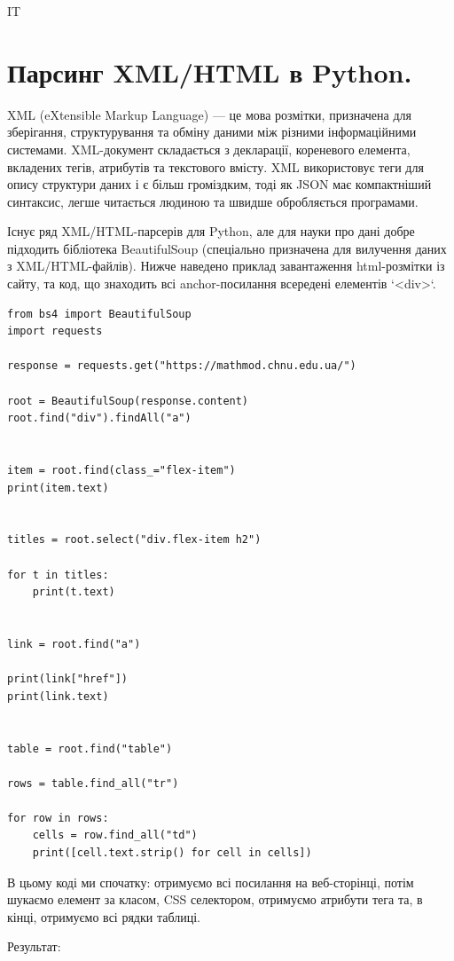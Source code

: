 \begin{console}
IT
\end{console}




\section{Парсинг XML/HTML в Python.}

XML (eXtensible Markup Language) — це мова розмітки, призначена для зберігання, структурування та 
обміну даними між різними інформаційними системами. XML-документ складається з декларації, 
кореневого елемента, вкладених тегів, атрибутів та текстового вмісту. XML використовує теги 
для опису структури даних і є більш громіздким, тоді як JSON має компактніший синтаксис, 
легше читається людиною та швидше обробляється програмами. 

Існує ряд XML/HTML-парсерів для Python, але для науки про дані добре підходить бібліотека 
BeautifulSoup (спеціально призначена для вилучення даних з XML/HTML-файлів). Нижче наведено 
приклад завантаження html-розмітки із сайту, та код, що знаходить всі anchor-посилання 
всередені елементів `<div>`.

\begin{lstlisting}
from bs4 import BeautifulSoup
import requests

response = requests.get("https://mathmod.chnu.edu.ua/")

root = BeautifulSoup(response.content)
root.find("div").findAll("a")


item = root.find(class_="flex-item")
print(item.text)


titles = root.select("div.flex-item h2")

for t in titles:
    print(t.text)


link = root.find("a")

print(link["href"])
print(link.text)


table = root.find("table")

rows = table.find_all("tr")

for row in rows:
    cells = row.find_all("td")
    print([cell.text.strip() for cell in cells])
\end{lstlisting}

В цьому коді ми спочатку: отримуємо всі посилання на веб-сторінці, потім шукаємо 
елемент за класом, CSS селектором, отримуємо атрибути тега та, в кінці, отримуємо всі рядки таблиці.

Результат:

